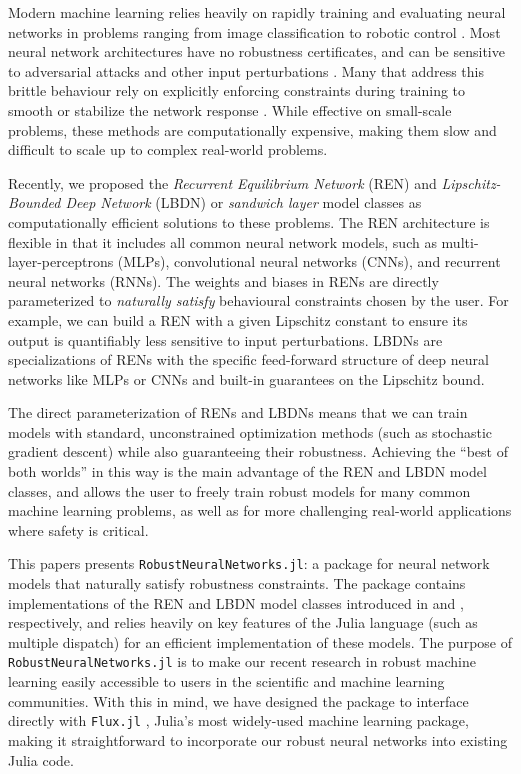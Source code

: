 Modern machine learning relies heavily on rapidly training and evaluating neural networks in problems ranging from image classification \cite{He++2016} to robotic control \cite{Siekmann++2021a}. Most neural network architectures have no robustness certificates, and can be sensitive to adversarial attacks and other input perturbations \cite{Huang++2017}. Many that address this brittle behaviour rely on explicitly enforcing constraints during training to smooth or stabilize the network response \cite{Pauli++2022,Junnarkar++2023}. While effective on small-scale problems, these methods are computationally expensive, making them slow and difficult to scale up to complex real-world problems.

Recently, we proposed the \textit{Recurrent Equilibrium Network} (REN) \cite{Revay++2023} and \textit{Lipschitz-Bounded Deep Network} (LBDN) or \textit{sandwich layer} \cite{Wang+Manchester2023} model classes as computationally efficient solutions to these problems. The REN architecture is flexible in that it includes all common neural network models, such as multi-layer-perceptrons (MLPs), convolutional neural networks (CNNs), and recurrent neural networks (RNNs). The weights and biases in RENs are directly parameterized to \textit{naturally satisfy} behavioural constraints chosen by the user. For example, we can build a REN with a given Lipschitz constant to ensure its output is quantifiably less sensitive to input perturbations. LBDNs are specializations of RENs with the specific feed-forward structure of deep neural networks like MLPs or CNNs and built-in guarantees on the Lipschitz bound.

The direct parameterization of RENs and LBDNs means that we can train models with standard, unconstrained optimization methods (such as stochastic gradient descent) while also guaranteeing their robustness. Achieving the “best of both worlds” in this way is the main advantage of the REN and LBDN model classes, and allows the user to freely train robust models for many common machine learning problems, as well as for more challenging real-world applications where safety is critical.

This papers presents \verb|RobustNeuralNetworks.jl|: a package for neural network models that naturally satisfy robustness constraints. The package contains implementations of the REN and LBDN model classes introduced in \cite{Revay++2023} and \cite{Wang+Manchester2023}, respectively, and relies heavily on key features of the Julia language \cite{Bezanson++2017} (such as multiple dispatch) for an efficient implementation of these models. The purpose of \verb|RobustNeuralNetworks.jl| is to make our recent research in robust machine learning easily accessible to users in the scientific and machine learning communities. With this in mind, we have designed the package to interface directly with \verb|Flux.jl| \cite{Innes2018}, Julia's most widely-used machine learning package, making it straightforward to incorporate our robust neural networks into existing Julia code.

